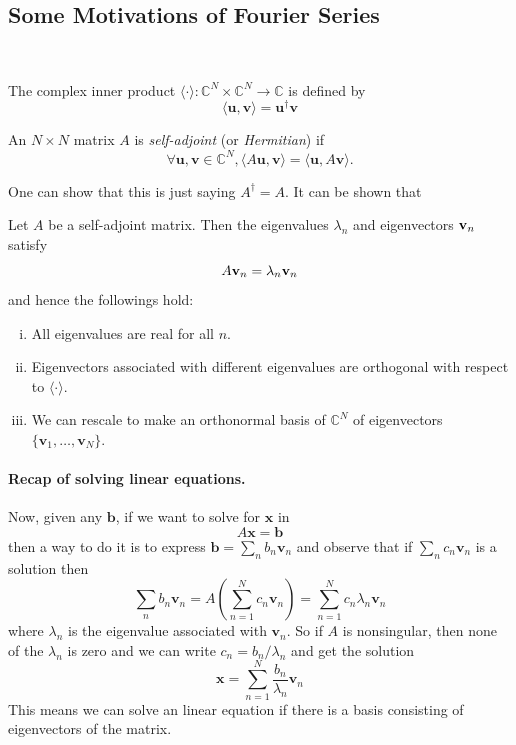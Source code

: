 \documentclass[a4paper]{article}
\begin{document}
\subsection{Some Motivations of Fourier Series}\ \vspace{-1.5em}
\begin{definition}
    The complex inner product $\langle\cdot\rangle:\mathbb C^N\times\mathbb C^N\to\mathbb C$ is defined by
    \begin{equation}
        \langle\mathbf{u},\mathbf{v}\rangle=\mathbf{u}^\dagger\mathbf{v}
    \end{equation}
\end{definition}
\begin{definition}
    An $N\times N$  matrix $A$ is \textit{self-adjoint} (or \textit{Hermitian}) if
    $$\forall\mathbf{u},\mathbf{v}\in\mathbb C^N,\langle A\mathbf{u},\mathbf{v}\rangle=\langle\mathbf{u},A\mathbf{v}\rangle.$$
\end{definition}
One can show that this is just saying $A^\dagger=A$.
It can be shown that
\begin{proposition}
    Let $A$ be a self-adjoint matrix. Then the eigenvalues $ \lambda_n $ and eigenvectors $ {\bf v}_n $ satisfy
    \begin{equation}
        A {\bf v}_n=\lambda_n{\bf v}_n
    \end{equation}
    and hence the followings hold:
    \begin{enumerate}[(i).]
        \item All eigenvalues are real for all $n$.
        \item Eigenvectors associated with different eigenvalues are orthogonal with respect to $\langle\cdot\rangle$.
        \item We can rescale to make an orthonormal basis of $\mathbb C^N$ of eigenvectors $\{\mathbf{v}_1,\ldots,\mathbf{v}_N\}$.
    \end{enumerate}
\end{proposition}
\paragraph{Recap of solving linear equations.}
Now, given any $\mathbf{b}$, if we want to solve for $\mathbf{x}$ in
\begin{equation}
    A\mathbf{x}=\mathbf{b}
\end{equation}
then a way to do it is to express $\mathbf{b}=\sum_nb_n\mathbf{v}_n$ and observe that if $\sum_nc_n\mathbf{v}_n$ is a solution then
$$\sum_nb_n\mathbf{v}_n=A\left(\sum_{n=1}^Nc_n\mathbf{v}_n\right)=\sum_{n=1}^Nc_n\lambda_n\mathbf{v}_n$$
where $\lambda_n$ is the eigenvalue associated with $\mathbf{v}_n$.
So if $A$ is nonsingular, then none of the $\lambda_n$ is zero and we can write $c_n=b_n/\lambda_n$ and get the solution
\begin{equation}
    \mathbf{x}=\sum_{n=1}^N\frac{b_n}{\lambda_n}\mathbf{v}_n
\end{equation}
This means we can solve an linear equation if there is a basis consisting of eigenvectors of the matrix.
\end{document}
